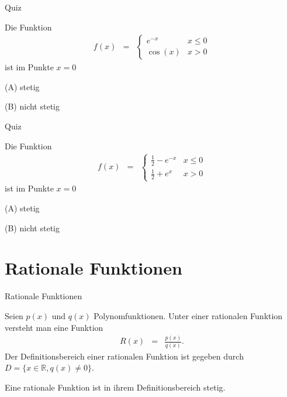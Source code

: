 \documentclass[german]{beamer}
\newcommand{\bq}{\begin{eqnarray*}}
\newcommand{\eq}{\end{eqnarray*}}
\begin{document}
\begin{frame}{Quiz}

Die Funktion
\bq
 f(x) & = & \left\{\begin{array}{ll} e^{-x} & x \le 0 \\ \cos(x) & x>0 \end{array} \right.
\eq
ist im Punkte $x=0$
\begin{description}
\item{(A)} stetig
\item{(B)} nicht stetig
\end{description}

\end{frame}

\begin{frame}{Quiz}

Die Funktion
\bq
 f(x) & = & \left\{\begin{array}{ll} \frac{1}{2} - e^{-x} & x \le 0 \\ \frac{1}{2} + e^{x} & x>0 \end{array} \right.
\eq
ist im Punkte $x=0$
\begin{description}
\item{(A)} stetig
\item{(B)} nicht stetig
\end{description}

\end{frame}


\section{Rationale Funktionen}

\frame{\sectionpage}

\begin{frame}{Rationale Funktionen}

\begin{definition}
Seien $p(x)$ und $q(x)$ Polynomfunktionen.
Unter einer rationalen Funktion versteht man eine Funktion
\bq
 R(x) & = & \frac{p(x)}{q(x)}.
\eq
Der Definitionsbereich einer rationalen Funktion ist gegeben durch
$D =\{ x\in {\mathbb R}, q(x) \neq 0\}$.
\end{definition}
Eine rationale Funktion ist in ihrem Definitionsbereich stetig.

\end{frame}
\end{document}
